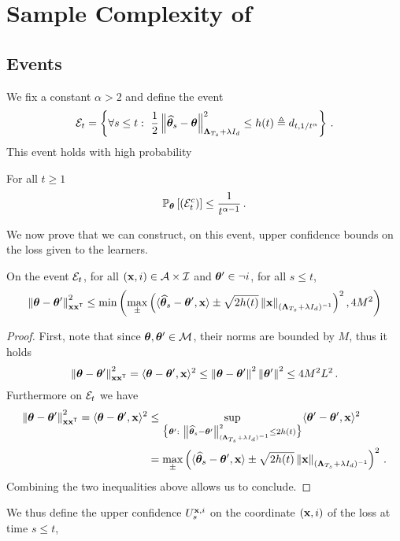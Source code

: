 \section{Sample Complexity of \texorpdfstring{\LG{}}{}}\label{app:lgc.proof}

\subsection{Events}\label{app:lgc.proof_nc.events}
We fix a constant $\alpha>2$ and define the event
\[
\cE_t = \left\{\forall s \leq  t:\ \frac{1}{2}\normm{\hbtheta_s-\btheta}^2_{\bLambda_{T_s}+\lambda I_d} \leq h(t)\eqdef d_{t,1/t^\alpha}\right\}\,.
\]
This event holds with high probability
\begin{lemma}
\label{lem:prb_Et_nc}
For all $t \geq 1$
\[
    \mathbb{P}_{\boldsymbol \theta}\left[\left(\mathcal{E}_t^c\right)\right]\leq \frac{1}{t^{\alpha-1}}\,.
\]
\end{lemma}
We now prove that we can construct, on this event, upper confidence bounds on the loss given to the learners.
\begin{lemma}
\label{lem:confidence_bound_general_nc}
On the event $\mathcal{E}_t$, for all $({\bf x},i)\in\mathcal{A}\times\mathcal{I}$ and ${\boldsymbol \theta}'\in\neg i$, for all $s\leq t$,
\[
\left\lVert{\boldsymbol \theta}-{\boldsymbol \theta}'\right\rVert^2_{{\bf x}{\bf x}^\mathsf{\scriptscriptstyle T}} \leq \min\left(\max_\pm \left( \langle \widehat{{\boldsymbol \theta}}_{s} - {\boldsymbol \theta}',{\bf x}\rangle \pm \sqrt{2 h(t)} \left\lVert{\bf x}\right\rVert_{({\boldsymbol \Lambda}_{T_s}+ \lambda I_d)^{-1}} \right)^2,4M^2\right)
\]
\end{lemma}
\begin{proof}
First, note that since ${\boldsymbol \theta},{\boldsymbol \theta}'\in\mathcal{M}$, their norms are bounded by $M$, thus it holds
\[
\left\lVert{\boldsymbol \theta}-{\boldsymbol \theta}'\right\rVert^2_{{\bf x}{\bf x}^\mathsf{\scriptscriptstyle T}} = \langle{\boldsymbol \theta}-{\boldsymbol \theta}',{\bf x} \rangle^2 \leq \left\lVert{\boldsymbol \theta}-{\boldsymbol \theta}'\right\rVert^2 \left\lVert{\boldsymbol \theta}'\right\rVert^2 \leq 4M^2L^2\,.
\]
Furthermore on $\mathcal{E}_t$ we have
\begin{align*}
\normm{\btheta-\btheta'}^2_{\bx\bx\transpose} = \langle\btheta-\btheta',\bx \rangle^2 &\leq \sup_{\big\{\btheta':\ \normm{\hbtheta_s-\btheta'}^2_{(\bLambda_{T_s} + \lambda I_d)^{-1} } \leq 2h(t)\big\}} \langle\btheta'-\btheta',\bx \rangle^2\\
&=\max_\pm \left( \langle \hbtheta_{s} - \btheta',\bx\rangle \pm \sqrt{2 h(t)} \normm{\bx}_{(\bLambda_{T_s}+ \lambda I_d)^{-1}} \right)^2\,.
\end{align*}
Combining the two inequalities above allows us to conclude.
\end{proof}
We thus define the upper confidence $U_s^{{\bf x},i}$ on the coordinate $({\bf x},i)$ of the loss at time $s\leq t$,
